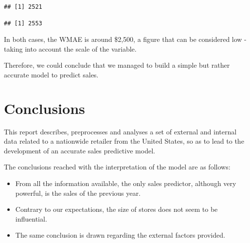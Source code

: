 \documentclass[11pt,]{article}
\newenvironment{Shaded}{\begin{snugshade}}{\end{snugshade}}
\newcommand{\KeywordTok}[1]{\textcolor[rgb]{0.13,0.29,0.53}{\textbf{{#1}}}}
\newcommand{\StringTok}[1]{\textcolor[rgb]{0.31,0.60,0.02}{{#1}}}
\newcommand{\CommentTok}[1]{\textcolor[rgb]{0.56,0.35,0.01}{\textit{{#1}}}}
\newcommand{\NormalTok}[1]{{#1}}
\providecommand{\tightlist}{%
  \setlength{\itemsep}{0pt}\setlength{\parskip}{0pt}}
\begin{document}
\begin{Shaded}
\end{Shaded}

\begin{verbatim}
## [1] 2521
\end{verbatim}

\begin{Shaded}
\end{Shaded}

\begin{verbatim}
## [1] 2553
\end{verbatim}

In both cases, the WMAE is around \$2,500, a figure that can be
considered low - taking into account the scale of the variable.

Therefore, we could conclude that we managed to build a simple but
rather accurate model to predict sales.

\section{Conclusions}\label{conclusions}

This report describes, preprocesses and analyses a set of external and
internal data related to a nationwide retailer from the United States,
so as to lead to the development of an accurate sales predictive model.

The conclusions reached with the interpretation of the model are as
follows:

\begin{itemize}
\tightlist
\item
  From all the information available, the only sales predictor, although
  very powerful, is the sales of the previous year.
\item
  Contrary to our expectations, the size of stores does not seem to be
  influential.
\item
  The same conclusion is drawn regarding the external factors provided.
\end{itemize}
\end{document}
